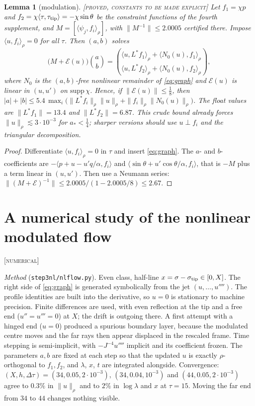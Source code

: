 \documentclass[11pt]{amsart}
\newtheorem{lemma}[theorem]{Lemma}
\theoremstyle{remark}
\newcommand{\ip}[2]{\langle #1,#2\rangle}
\newcommand{\lab}[1]{\textup{\textsc{[#1]}}}
\begin{document}
\begin{lemma}[modulation]\lab{proved, constants to be made explicit}
Let $f_1=\chi p$ and $f_2=\chi\ip{\tau}{\tau_{\rm tip}}=-\chi\sin\theta$ be the constraint functions of the fourth supplement, and $M=[\ip{\psi_j}{f_i}_\rho]$, with $\|M^{-1}\|\le2.0005$ certified there. Impose $\ip{u}{f_i}_\rho=0$ for all $\tau$. Then $(a,b)$ solves
\[
\big(M+\mathcal E(u)\big)\binom ab=\binom{\ip{u}{L^*f_1}_\rho+\ip{N_0(u)}{f_1}_\rho}{\ip{u}{L^*f_2}_\rho+\ip{N_0(u)}{f_2}_\rho},
\]
where $N_0$ is the $(a,b)$-free nonlinear remainder of \eqref{eq:graph} and $\mathcal E(u)$ is linear in $(u,u')$ on $\mathrm{supp}\,\chi$. Hence, if $\|\mathcal E(u)\|\le\frac18$, then $|a|+|b|\le5.4\,\max_i\big(\|L^*f_i\|_\rho\|u\|_\rho+\|f_i\|_\rho\|N_0(u)\|_\rho\big)$. The float values are $\|L^*f_1\|=13.4$ and $\|L^*f_2\|=6.87$. This crude bound already forces $\|u\|_\rho\lesssim3\cdot10^{-3}$ for $a_*<\frac14$; sharper versions should use $u\perp f_i$ and the triangular decomposition.
\end{lemma}
\begin{proof}
Differentiate $\ip{u}{f_i}_\rho=0$ in $\tau$ and insert \eqref{eq:graph}. The $a$- and $b$-coefficients are $-\ip{p+u-u'q/\alpha}{f_i}$ and $\ip{\sin\theta+u'\cos\theta/\alpha}{f_i}$, that is $-M$ plus a term linear in $(u,u')$. Then use a Neumann series: $\|(M+\mathcal E)^{-1}\|\le2.0005/(1-2.0005/8)\le2.67$.
\end{proof}

\section{A numerical study of the nonlinear modulated flow}\label{sec:num}\lab{numerical}

\emph{Method} (\texttt{step3nl/nlflow.py}). Even class, half-line $x=\sigma-\sigma_{\rm tip}\in[0,X]$. The right side of \eqref{eq:graph} is generated symbolically from the jet $(u,\dots,u'''')$. The profile identities are built into the derivative, so $u=0$ is stationary to machine precision. Finite differences are used, with even reflection at the tip and a free end ($u''=u'''=0$) at $X$; the drift is outgoing there. A first attempt with a hinged end ($u=0$) produced a spurious boundary layer, because the modulated centre moves and the far rays then appear displaced in the rescaled frame. Time stepping is semi-implicit, with $-J^{-4}u''''$ implicit and its coefficient frozen. The parameters $a,b$ are fixed at each step so that the updated $u$ is exactly $\rho$-orthogonal to $f_1,f_2$, and $\lambda$, $x$, $t$ are integrated alongside. Convergence: $(X,h,\Delta\tau)=(34,0.05,2\cdot10^{-3})$, $(34,0.04,10^{-3})$ and $(44,0.05,2\cdot10^{-3})$ agree to $0.3\%$ in $\|u\|_\rho$ and to $2\%$ in $\log\lambda$ and $x$ at $\tau=15$. Moving the far end from $34$ to $44$ changes nothing visible.
\end{document}
